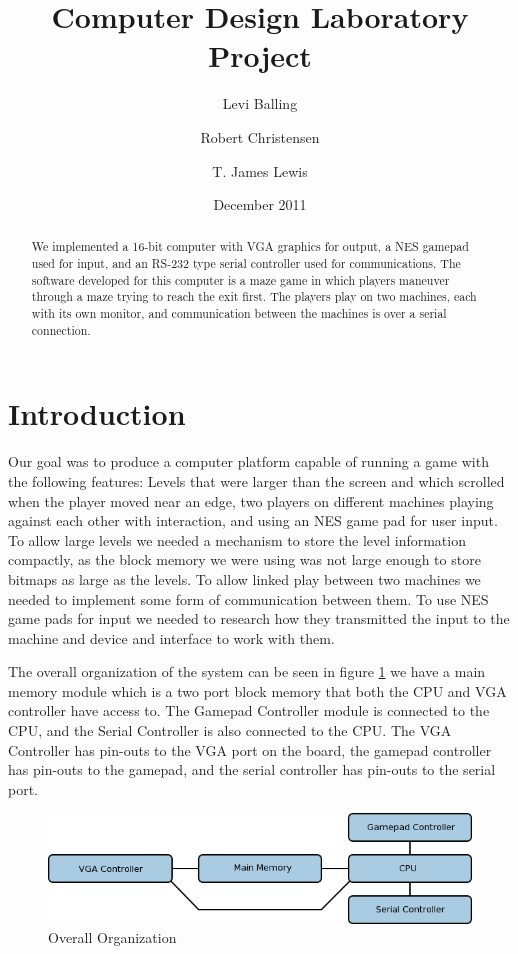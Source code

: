 \documentclass{article}
\title{Computer Design Laboratory Project}
\author{Levi Balling \and Robert Christensen \and T. James Lewis}
\date{December 2011}
\begin{document}
\maketitle
\pagebreak


\begin{abstract}
	We implemented a 16-bit computer with VGA graphics for output, a NES gamepad used for input, and an RS-232 type serial controller used for communications. The software developed for this computer is a maze game in which players maneuver through a maze trying to reach the exit first. The players play on two machines, each with its own monitor, and communication between the machines is over a serial connection.
\end{abstract}

\section{Introduction}
Our goal was to produce a computer platform capable of running a game with the following features: Levels that were larger than the screen and which scrolled when the player moved near an edge, two players on different machines playing against each other with interaction, and using an NES game pad for user input. To allow large levels we needed a mechanism to store the level information compactly, as the block memory we were using was not large enough to store bitmaps as large as the levels. To allow linked play between two machines we needed to implement some form of communication between them. To use NES game pads for input we needed to research how they transmitted the input to the machine and device and interface to work with them.

The overall organization of the system can be seen in figure \ref{oo} we have a main memory module which is a two port block memory that both the CPU and VGA controller have access to. The Gamepad Controller module is connected to the CPU, and the Serial Controller is also connected to the CPU. The VGA Controller has pin-outs to the VGA port on the board, the gamepad controller has pin-outs to the gamepad, and the serial controller has pin-outs to the serial port.

\begin{figure}[h!]
	\centering
	\includegraphics[width = 1\textwidth]{OverallOrganization.png}
	\caption{Overall Organization}
	\label{oo}
\end{figure}
\end{document}
